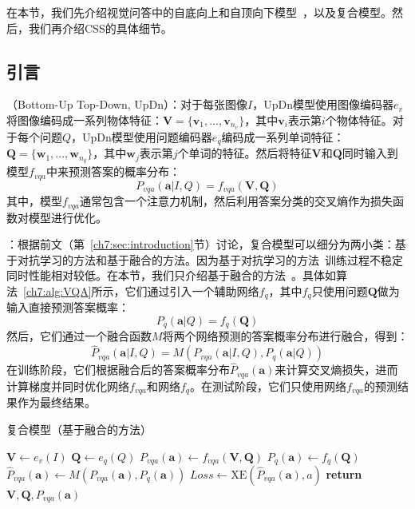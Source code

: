 在本节，我们先介绍视觉问答中的自底向上和自顶向下模型~\cite{anderson2018bottom}，以及复合模型。然后，我们再介绍CSS的具体细节。

\subsection{引言}

\textbf{}（Bottom-Up Top-Down, UpDn）：对于每张图像$I$，UpDn模型使用图像编码器$e_v$将图像编码成一系列物体特征：$\bm{V} = \{\bm{v}_1, ..., \bm{v}_{n_v}\}$，其中$\bm{v}_i$表示第$i$个物体特征。对于每个问题$Q$，UpDn模型使用问题编码器$e_q$编码成一系列单词特征：$\bm{Q} = \{\bm{w}_1, ..., \bm{w}_{n_q}\}$，其中$\bm{w}_j$表示第$j$个单词的特征。然后将特征$\bm{V}$和$\bm{Q}$同时输入到模型$f_{vqa}$中来预测答案的概率分布：
\begin{equation} \label{ch7:eq:p_vqa}
    P_{vqa}(\bm{a}|I, Q) = f_{vqa}(\bm{V}, \bm{Q})
\end{equation}
其中，模型$f_{vqa}$通常包含一个注意力机制，然后利用答案分类的交叉熵作为损失函数对模型进行优化。

\textbf{}：根据前文（第~\ref{ch7:sec:introduction}节）讨论，复合模型可以细分为两小类：基于对抗学习的方法和基于融合的方法。因为基于对抗学习的方法~\cite{ramakrishnan2018overcoming,grand2019adversarial,belinkov2019don}训练过程不稳定同时性能相对较低。在本节，我们只介绍基于融合的方法~\cite{cadene2019rubi,clark2019don,mahabadi2019simple}。具体如算法~\ref{ch7:alg:VQA}所示，它们通过引入一个辅助网络$f_q$，其中$f_q$只使用问题$\bm{Q}$做为输入直接预测答案概率：
\begin{equation}
P_{q}(\bm{a}|Q) = f_{q}(\bm{Q})
\end{equation}
然后，它们通过一个融合函数$M$将两个网络预测的答案概率分布进行融合，得到：
\begin{equation}
\hat{P}_{vqa}(\bm{a}|I, Q) = M(P_{vqa}(\bm{a}|I, Q), P_{q}(\bm{a}|Q))
\end{equation}
在训练阶段，它们根据融合后的答案概率分布$\hat{P}_{vqa}(\bm{a})$来计算交叉熵损失，进而计算梯度并同时优化网络$f_{vqa}$和网络$f_q$。在测试阶段，它们只使用网络$f_{vqa}$的预测结果作为最终结果。

\begin{algorithm}[t]
    \caption{复合模型（基于融合的方法）}\label{ch7:alg:VQA}
    \begin{algorithmic}[1]
        \State $ \bm{V} \leftarrow e_v(I) $
        \State $ \bm{Q} \leftarrow e_q(Q) $
        \State $ P_{vqa}(\bm{a}) \leftarrow f_{vqa}(\bm{V}, \bm{Q}) $
        \State $ P_{q}(\bm{a}) \leftarrow f_{q}(\bm{Q})$      
        \State $ \hat{P}_{vqa}(\bm{a}) \leftarrow M(P_{vqa}(\bm{a}), P_{q}(\bm{a}))  $
        \State $ Loss \leftarrow \text{XE}(\hat{P}_{vqa}(\bm{a}), a)$ 
        \State \textbf{return} $\bm{V}, \bm{Q}, P_{vqa}(\bm{a})$
        \EndIf 
        \EndFunction
    \end{algorithmic}
\end{algorithm}

